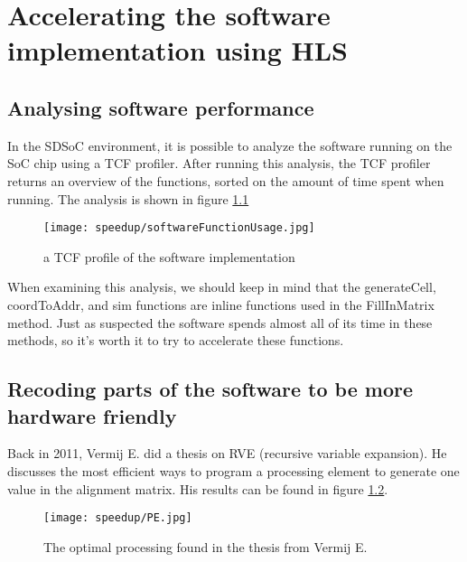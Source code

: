 
\chapter{Accelerating the software implementation using HLS}
\label{ch:HardwareImpl}

\section{Analysing software performance}

In the SDSoC environment, it is possible to analyze the software running on the SoC chip using a TCF profiler. After running this analysis, the TCF profiler returns an overview of the functions, sorted on the amount of time spent when running. The analysis is shown in figure \ref{fig:softwareFunctionUsage}

\begin{figure}[H]
	\centering
	\texttt{[image: speedup/softwareFunctionUsage.jpg]}
	\caption{a TCF profile of the software implementation}
	\label{fig:softwareFunctionUsage}
\end{figure}

When examining this analysis, we should keep in mind that the generateCell, coordToAddr, and sim functions are inline functions used in the FillInMatrix method. Just as suspected the software spends almost all of its time in these methods, so it's worth it to try to accelerate these functions.

\section{Recoding parts of the software to be more hardware friendly}

Back in 2011, Vermij E. did a thesis\cite{Vermij} on RVE (recursive variable expansion). He discusses the most efficient ways to program a processing element to generate one value in the alignment matrix. His results can be found in figure \ref{fig:PE}. 

\begin{figure}[H]
	\centering
	\texttt{[image: speedup/PE.jpg]}
	\caption{The optimal processing found in the thesis from Vermij E.\cite{Vermij}}
	\label{fig:PE}
\end{figure}


